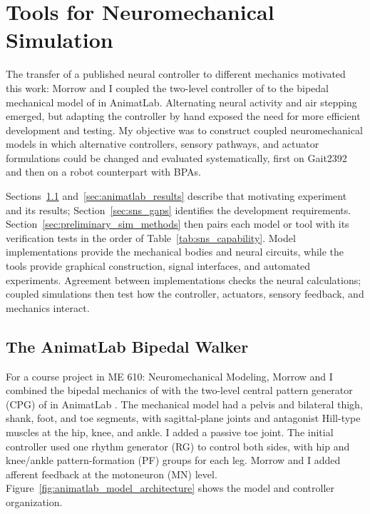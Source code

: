 \chapter{Tools for Neuromechanical Simulation}\label{ch:sns}
\graphicspath{{../Figures/60-sns/}{figs/60-sns/}}

The transfer of a published neural controller to different mechanics motivated this work: Morrow and I coupled the two-level controller of \citet{deng_neuromechanical_2019} to the bipedal mechanical model of \citet{li_bipedal_2017} in AnimatLab. Alternating neural activity and air stepping emerged, but adapting the controller by hand exposed the need for more efficient development and testing. My objective was to construct coupled neuromechanical models in which alternative controllers, sensory pathways, and actuator formulations could be changed and evaluated systematically, first on Gait2392 and then on a robot counterpart with BPAs.

Sections~\ref{sec:prior_walker} and~\ref{sec:animatlab_results} describe that motivating experiment and its results; Section~\ref{sec:sns_gaps} identifies the development requirements. Section~\ref{sec:preliminary_sim_methods} then pairs each model or tool with its verification tests in the order of Table~\ref{tab:sns_capability}. Model implementations provide the mechanical bodies and neural circuits, while the tools provide graphical construction, signal interfaces, and automated experiments. Agreement between implementations checks the neural calculations; coupled simulations then test how the controller, actuators, sensory feedback, and mechanics interact.

\section{The AnimatLab Bipedal Walker}\label{sec:prior_walker}

For a course project in ME 610: Neuromechanical Modeling, Morrow and I combined the bipedal mechanics of \citet{li_bipedal_2017} with the two-level central pattern generator (CPG) of \citet{deng_neuromechanical_2019} in AnimatLab \citep{cofer_animatlab_2010}. The mechanical model had a pelvis and bilateral thigh, shank, foot, and toe segments, with sagittal-plane joints and antagonist Hill-type muscles at the hip, knee, and ankle. I added a passive toe joint. The initial controller used one rhythm generator (RG) to control both sides, with hip and knee/ankle pattern-formation (PF) groups for each leg. Morrow and I added afferent feedback at the motoneuron (MN) level. Figure~\ref{fig:animatlab_model_architecture} shows the model and controller organization.

